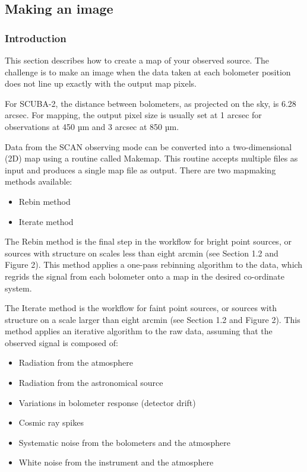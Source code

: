 \documentclass[twoside,11pt]{article}
\renewcommand{\_}{\texttt{\symbol{95}}}
\begin{document}
\subsection{Making an image}

\subsubsection{Introduction}

This section describes how to create a map of your observed
source. The challenge is to make an image when the data taken at each
bolometer position does not line up exactly with the output map
pixels.

For SCUBA-2, the distance between bolometers, as projected on the sky,
is 6.28 arcsec. For mapping, the output pixel size is usually set at 1
arcsec for observations at 450 µm and 3 arcsec at 850 µm.

Data from the SCAN observing mode can be converted into a
two-dimensional (2D) map using a routine called Makemap. This routine
accepts multiple files as input and produces a single map file as
output. There are two mapmaking methods available:
\begin{itemize}
\item Rebin method
\item Iterate method
\end{itemize}

The Rebin method is the final step in the workflow for bright point
sources, or sources with structure on scales less than eight arcmin
(see Section 1.2 and Figure 2). This method applies a one-pass
rebinning algorithm to the data, which regrids the signal from each
bolometer onto a map in the desired co-ordinate system.

The Iterate method is the workflow for faint point sources, or sources
with structure on a scale larger than eight arcmin (see Section 1.2
and Figure 2). This method applies an iterative algorithm to the raw
data, assuming that the observed signal is composed of:
\begin{itemize}
\item Radiation from the atmosphere
\item Radiation from the astronomical source
\item Variations in bolometer response (detector drift)
\item Cosmic ray spikes
\item Systematic noise from the bolometers and the atmosphere
\item White noise from the instrument and the atmosphere
\end{itemize}
\end{document}
